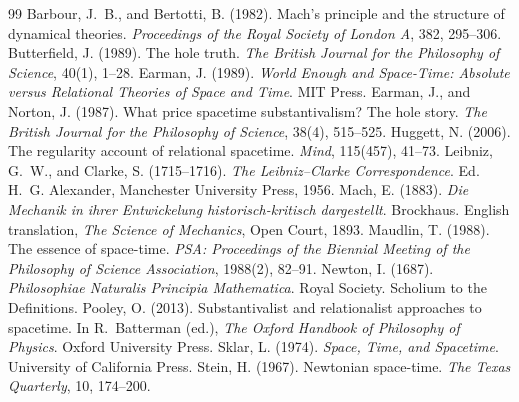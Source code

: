 \documentclass{situationist-preprint}
\begin{document}
\begin{thebibliography}{99}\small
{} Barbour, J.~B., and Bertotti, B. (1982). Mach's principle and the structure of dynamical theories. \emph{Proceedings of the Royal Society of London A}, 382, 295--306.
 Butterfield, J. (1989). The hole truth. \emph{The British Journal for the Philosophy of Science}, 40(1), 1--28.
 Earman, J. (1989). \emph{World Enough and Space-Time: Absolute versus Relational Theories of Space and Time}. MIT Press.
 Earman, J., and Norton, J. (1987). What price spacetime substantivalism? The hole story. \emph{The British Journal for the Philosophy of Science}, 38(4), 515--525.
 Huggett, N. (2006). The regularity account of relational spacetime. \emph{Mind}, 115(457), 41--73.
 Leibniz, G.~W., and Clarke, S. (1715--1716). \emph{The Leibniz--Clarke Correspondence}. Ed. H.~G. Alexander, Manchester University Press, 1956.
 Mach, E. (1883). \emph{Die Mechanik in ihrer Entwickelung historisch-kritisch dargestellt}. Brockhaus. English translation, \emph{The Science of Mechanics}, Open Court, 1893.
 Maudlin, T. (1988). The essence of space-time. \emph{PSA: Proceedings of the Biennial Meeting of the Philosophy of Science Association}, 1988(2), 82--91.
 Newton, I. (1687). \emph{Philosophiae Naturalis Principia Mathematica}. Royal Society. Scholium to the Definitions.
 Pooley, O. (2013). Substantivalist and relationalist approaches to spacetime. In R.~Batterman (ed.), \emph{The Oxford Handbook of Philosophy of Physics}. Oxford University Press.
 Sklar, L. (1974). \emph{Space, Time, and Spacetime}. University of California Press.
 Stein, H. (1967). Newtonian space-time. \emph{The Texas Quarterly}, 10, 174--200.
\end{thebibliography}
\end{document}
